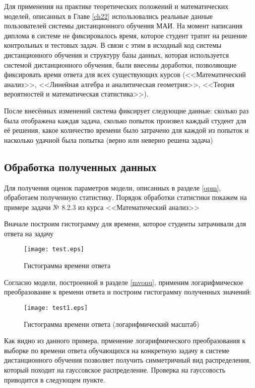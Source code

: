 Для применения на практике теоретических положений и математических моделей, описанных в Главе \ref{ch22} использовались реальные данные пользователей системы дистанцион\-ного обучения МАИ. На момент написания диплома в системе не фиксировалось время, которое студент тратит на решение контрольных и тестовых задач. В связи с этим в исходный код системы дистанционного обучения и структуру базы данных, которая исполь\-зуется системой дистанционного обучения, были внесены доработки, позволяющие фикси\-ровать время ответа для всех существующих курсов (<<Математический анализ>>, <<Линейная алгебра и аналитическая геометрия>>, <<Теория вероятностей и математическая статистика>>).

После внесённых изменений система фиксирует следующие данные: сколько раз была отображена каждая задача, сколько попыток произвел каждый студент для её решения, какое количество времени было затрачено для каждой из попыток и насколько удачной была попытка (верно или неверно решена задача)

\subsection{Обработка полученных данных}

Для получения оценок параметров модели, описанных в разделе \ref{opm}, обработаем полученную статистику. Порядок обработки статистики покажем на примере задачи № 8.2.3 из курса <<Математический анализ>>

Вначале построим гистограмму для времени, которое студенты затрачивали для ответа на задачу
\begin{figure}[ht!]
\centering \texttt{[image: test.eps]}
\caption{Гистограмма времени ответа}
\end{figure}

Согласно модели, построенной в разделе \ref{mvonu}, применим логарифмическое \\преобразование к времени ответа и построим гистограмму полученных значений:
\begin{figure}[ht!]
\centering \texttt{[image: test1.eps]}
\caption{Гистограмма времени ответа (логарифмический масштаб)}
\end{figure}

Как видно из данного примера, прменение логарифмического преобразования к выборке по времени ответа обучающихся на конкретную задачу в системе дистанционного обучения позволяет получить симметричный вид распределения, который походит на гауссовское распределение. Проверка на гауссовость приводится в следующем пункте.

